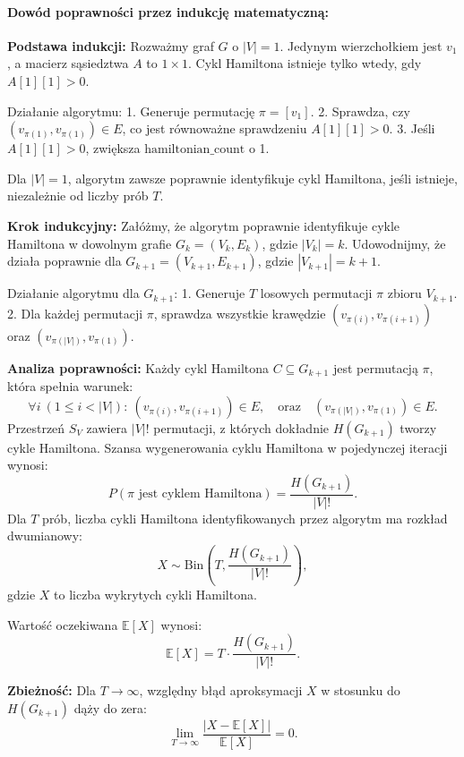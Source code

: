 \paragraph{Dowód poprawności przez indukcję matematyczną:}

\textbf{Podstawa indukcji:}  
Rozważmy graf \( G \) o \( |V| = 1 \). Jedynym wierzchołkiem jest \( v_1 \), a macierz sąsiedztwa \( A \) to \( 1 \times 1 \). Cykl Hamiltona istnieje tylko wtedy, gdy \( A[1][1] > 0 \).

Działanie algorytmu:
1. Generuje permutację \( \pi = [v_1] \).
2. Sprawdza, czy \( (v_{\pi(1)}, v_{\pi(1)}) \in E \), co jest równoważne sprawdzeniu \( A[1][1] > 0 \).
3. Jeśli \( A[1][1] > 0 \), zwiększa \( \text{hamiltonian\_count} \) o 1.

Dla \( |V| = 1 \), algorytm zawsze poprawnie identyfikuje cykl Hamiltona, jeśli istnieje, niezależnie od liczby prób \( T \).

\textbf{Krok indukcyjny:}  
Załóżmy, że algorytm poprawnie identyfikuje cykle Hamiltona w dowolnym grafie \( G_k = (V_k, E_k) \), gdzie \( |V_k| = k \). Udowodnijmy, że działa poprawnie dla \( G_{k+1} = (V_{k+1}, E_{k+1}) \), gdzie \( |V_{k+1}| = k+1 \).

Działanie algorytmu dla \( G_{k+1} \):
1. Generuje \( T \) losowych permutacji \( \pi \) zbioru \( V_{k+1} \).
2. Dla każdej permutacji \( \pi \), sprawdza wszystkie krawędzie \( (v_{\pi(i)}, v_{\pi(i+1)}) \) oraz \( (v_{\pi(|V|)}, v_{\pi(1)}) \).

\textbf{Analiza poprawności:}  
Każdy cykl Hamiltona \( C \subseteq G_{k+1} \) jest permutacją \( \pi \), która spełnia warunek:
\[
\forall i \ (1 \leq i < |V|): \ (v_{\pi(i)}, v_{\pi(i+1)}) \in E, \quad \text{oraz} \quad (v_{\pi(|V|)}, v_{\pi(1)}) \in E.
\]
Przestrzeń \( S_V \) zawiera \( |V|! \) permutacji, z których dokładnie \( H(G_{k+1}) \) tworzy cykle Hamiltona. Szansa wygenerowania cyklu Hamiltona w pojedynczej iteracji wynosi:
\[
P(\pi \text{ jest cyklem Hamiltona}) = \frac{H(G_{k+1})}{|V|!}.
\]
Dla \( T \) prób, liczba cykli Hamiltona identyfikowanych przez algorytm ma rozkład dwumianowy:
\[
X \sim \text{Bin}\left(T, \frac{H(G_{k+1})}{|V|!}\right),
\]
gdzie \( X \) to liczba wykrytych cykli Hamiltona.

Wartość oczekiwana \( \mathbb{E}[X] \) wynosi:
\[
\mathbb{E}[X] = T \cdot \frac{H(G_{k+1})}{|V|!}.
\]

\textbf{Zbieżność:}  
Dla \( T \to \infty \), względny błąd aproksymacji \( X \) w stosunku do \( H(G_{k+1}) \) dąży do zera:
\[
\lim_{T \to \infty} \frac{|X - \mathbb{E}[X]|}{\mathbb{E}[X]} = 0.
\]

